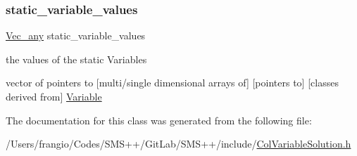 \subsubsection{\texorpdfstring{static\+\_\+variable\+\_\+values}{static\_variable\_values}}
{\footnotesize\ttfamily \mbox{\hyperlink{group___s_m_s__types_ga58ded0963812566c064a5177b2f84c28}{Vec\+\_\+any}} static\+\_\+variable\+\_\+values\hspace{0.3cm}{\ttfamily [protected]}}



the values of the static Variables 

vector of pointers to \mbox{[}multi/single dimensional arrays of\mbox{]} \mbox{[}pointers to\mbox{]} \mbox{[}classes derived from\mbox{]} \mbox{\hyperlink{class_s_m_spp__di__unipi__it_1_1_variable}{Variable}} 

The documentation for this class was generated from the following file\+:\begin{DoxyCompactItemize}
\item 
/\+Users/frangio/\+Codes/\+S\+M\+S++/\+Git\+Lab/\+S\+M\+S++/include/\mbox{\hyperlink{_col_variable_solution_8h}{Col\+Variable\+Solution.\+h}}\end{DoxyCompactItemize}
